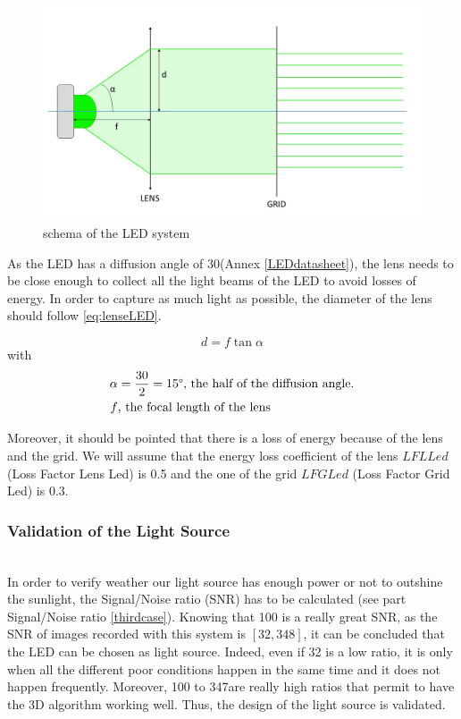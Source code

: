 \begin{figure}[h]
  \centerline{\includegraphics[scale=0.4]{fig/LEDsystem.jpg}}
  \caption{schema of the LED system}
  \label{fig:LEDsystem}
\end{figure}

As the LED has a diffusion angle of 30\textdegree (Annex \ref{LEDdatasheet}), the lens needs to be close enough to collect all the light beams of the LED to avoid losses of energy. In order to capture as much light as possible, the diameter of the lens should follow \eqref{eq:lenseLED}.

\begin{equation}
\label{eq:lenseLED}
d = f \tan \alpha
\end{equation}
with 
\begin{align*}
\alpha & = \frac{30}{2} = 15\mbox{\textdegree, the half of the diffusion angle.}\\
f & \mbox{, the focal length of the lens}
\end{align*}

Moreover, it should be pointed that there is a loss of energy because of the lens and the grid. We will assume that the energy loss coefficient of the lens $LFLLed$ (Loss Factor Lens Led) is 0.5 and the one of the grid $LFGLed$ (Loss Factor Grid Led) is 0.3.

\subsubsection{Validation of the Light Source}
\label{light Power}
~\\
In order to verify weather our light source has enough power or not to outshine the sunlight, the Signal/Noise ratio (SNR) has to be calculated (see part Signal/Noise ratio \ref{thirdcase}). Knowing that 100 is a really great SNR, as the SNR of images recorded with this system is $[32, 348]$, it can be concluded that the LED can be chosen as light source. Indeed, even if 32 is a low ratio, it is only when all the different poor conditions happen in the same time and it does not happen frequently. Moreover, 100 to 347are really high ratios that permit to have the 3D algorithm working well. Thus, the design of the light source is validated.




